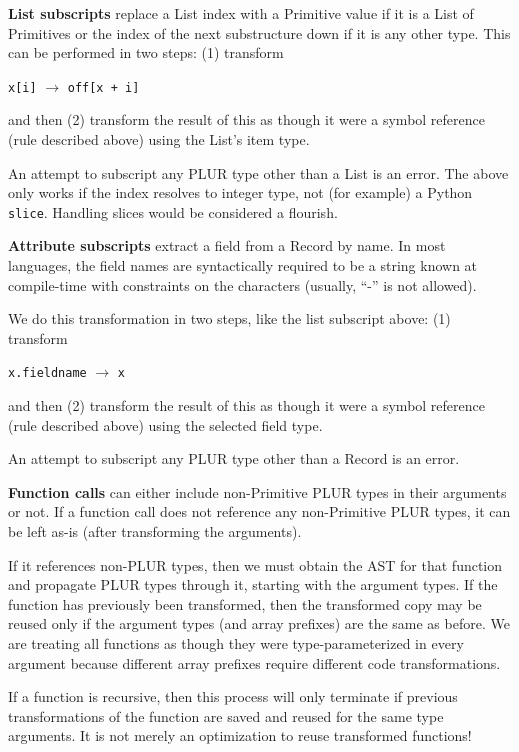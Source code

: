 \documentclass[10pt, conference, compsocconf]{IEEEtran}
\begin{document}
{\bf List subscripts} replace a List index with a Primitive value if it is a List of Primitives or the index of the next substructure down if it is any other type. This can be performed in two steps: (1) transform
\begin{center}
{\tt x[i]} $\to$ {\tt off[x + i]}
\end{center}
and then (2) transform the result of this as though it were a symbol reference (rule described above) using the List's item type.

An attempt to subscript any PLUR type other than a List is an error. The above only works if the index resolves to integer type, not (for example) a Python {\tt slice}. Handling slices would be considered a flourish.

{\bf Attribute subscripts} extract a field from a Record by name. In most languages, the field names are syntactically required to be a string known at compile-time with constraints on the characters (usually, ``-'' is not allowed).

We do this transformation in two steps, like the list subscript above: (1) transform
\begin{center}
{\tt x.fieldname} $\to$ {\tt x}
\end{center}
and then (2) transform the result of this as though it were a symbol reference (rule described above) using the selected field type.

An attempt to subscript any PLUR type other than a Record is an error.

{\bf Function calls} can either include non-Primitive PLUR types in their arguments or not. If a function call does not reference any non-Primitive PLUR types, it can be left as-is (after transforming the arguments).

If it references non-PLUR types, then we must obtain the AST for that function and propagate PLUR types through it, starting with the argument types. If the function has previously been transformed, then the transformed copy may be reused only if the argument types (and array prefixes) are the same as before. We are treating all functions as though they were type-parameterized in every argument because different array prefixes require different code transformations.

If a function is recursive, then this process will only terminate if previous transformations of the function are saved and reused for the same type arguments. It is not merely an optimization to reuse transformed functions!
\end{document}
